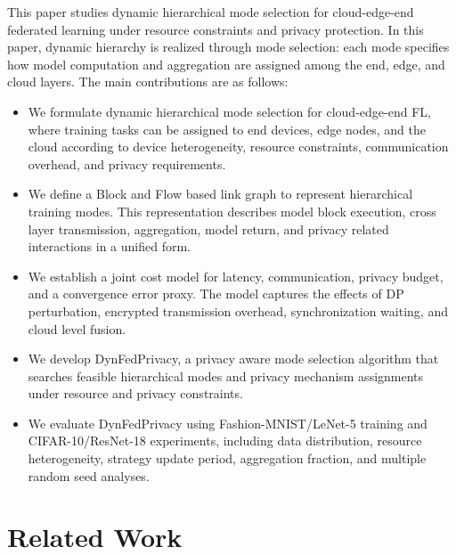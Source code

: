 ﻿\documentclass[preprint,12pt]{elsarticle}
\theoremstyle{plain}
\theoremstyle{definition}
\theoremstyle{remark}
\newcommand{\method}{DynFedPrivacy}
\begin{document}
This paper studies dynamic hierarchical mode selection for cloud-edge-end federated learning under resource constraints and privacy protection.
In this paper, dynamic hierarchy is realized through mode selection: each mode specifies how model computation and aggregation are assigned among the end, edge, and cloud layers.
The main contributions are as follows:
\begin{itemize}
    \item We formulate dynamic hierarchical mode selection for cloud-edge-end FL, where training tasks can be assigned to end devices, edge nodes, and the cloud according to device heterogeneity, resource constraints, communication overhead, and privacy requirements.
    \item We define a Block and Flow based link graph to represent hierarchical training modes. This representation describes model block execution, cross layer transmission, aggregation, model return, and privacy related interactions in a unified form.
    \item We establish a joint cost model for latency, communication, privacy budget, and a convergence error proxy. The model captures the effects of DP perturbation, encrypted transmission overhead, synchronization waiting, and cloud level fusion.
    \item We develop \method{}, a privacy aware mode selection algorithm that searches feasible hierarchical modes and privacy mechanism assignments under resource and privacy constraints.
    \item We evaluate \method{} using Fashion-MNIST/LeNet-5 training and CIFAR-10/ResNet-18 experiments, including data distribution, resource heterogeneity, strategy update period, aggregation fraction, and multiple random seed analyses.
\end{itemize}

\section{Related Work}
\label{sec:related_work}
\end{document}
